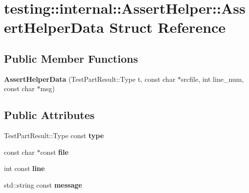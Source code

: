 \hypertarget{structtesting_1_1internal_1_1_assert_helper_1_1_assert_helper_data}{}\section{testing\+:\+:internal\+:\+:Assert\+Helper\+:\+:Assert\+Helper\+Data Struct Reference}
\label{structtesting_1_1internal_1_1_assert_helper_1_1_assert_helper_data}
\subsection*{Public Member Functions}
\begin{DoxyCompactItemize}
\item 
\mbox{\label{structtesting_1_1internal_1_1_assert_helper_1_1_assert_helper_data_ad2356f3f1e56d1a63562efe0f8b3f1bb}} 
{\bfseries Assert\+Helper\+Data} (Test\+Part\+Result\+::\+Type t, const char $\ast$srcfile, int line\+\_\+num, const char $\ast$msg)
\end{DoxyCompactItemize}
\subsection*{Public Attributes}
\begin{DoxyCompactItemize}
\item 
\mbox{\label{structtesting_1_1internal_1_1_assert_helper_1_1_assert_helper_data_a7b1d1a77882cd82107acea856d45692f}} 
Test\+Part\+Result\+::\+Type const {\bfseries type}
\item 
\mbox{\label{structtesting_1_1internal_1_1_assert_helper_1_1_assert_helper_data_a639ae4acc706e919b101786f71e9dc15}} 
const char $\ast$const {\bfseries file}
\item 
\mbox{\label{structtesting_1_1internal_1_1_assert_helper_1_1_assert_helper_data_aff816673320ecd035288dffe44760f90}} 
int const {\bfseries line}
\item 
\mbox{\label{structtesting_1_1internal_1_1_assert_helper_1_1_assert_helper_data_ae81536d57b8deb5dca4159cc6f7efdf0}} 
std\+::string const {\bfseries message}
\end{DoxyCompactItemize}
